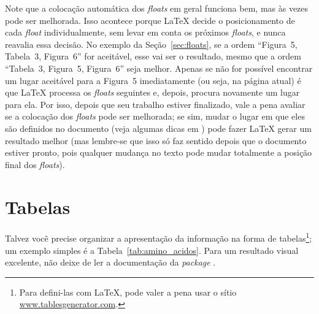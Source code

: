 Note que a colocação automática dos \emph{floats} em geral funciona bem,
mas às vezes pode ser melhorada. Isso acontece porque \LaTeX{} decide o
posicionamento de cada \emph{float} individualmente, sem levar em conta
os próximos \emph{floats}, e nunca reavalia essa decisão. No exemplo da
Seção~\ref{sec:floats}, se a ordem ``Figura~5, Tabela~3, Figura~6'' for
aceitável, esse vai ser o resultado, mesmo que a ordem ``Tabela~3, Figura~5,
Figura~6'' seja melhor. Apenas se não for possível encontrar um lugar
aceitável para a Figura~5 imediatamente (ou seja, na página atual) é que
\LaTeX{} processa os \emph{floats} seguintes e, depois, procura novamente
um lugar para ela. Por isso, depois que seu trabalho estiver finalizado,
vale a pena avaliar se a colocação dos \emph{floats} pode ser melhorada;
se sim, mudar o lugar em que eles são definidos no documento (veja algumas
dicas em \cite{floats2014}) pode fazer \LaTeX{} gerar um resultado melhor
(mas lembre-se que isso só faz sentido depois que o documento estiver
pronto, pois qualquer mudança no texto pode mudar totalmente a posição
final dos \emph{floats}).

\section{Tabelas}

Talvez você precise organizar a apresentação da informação na forma de
tabelas\footnote{Para defini-las com \LaTeX{}, pode valer a pena
usar o sítio \url{www.tablesgenerator.com}.};
um exemplo simples é a Tabela~\ref{tab:amino_acidos}. Para um resultado visual
excelente, não deixe de ler a documentação da \emph{package} .



